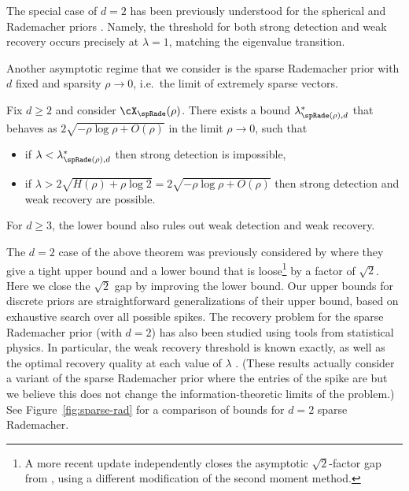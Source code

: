 \documentclass{article}
\begin{document}
The special case of $d=2$ has been previously understood for the spherical and Rademacher priors \cite{dam,mrz,pwbm}. Namely, the threshold for both strong detection and weak recovery occurs precisely at $\lambda = 1$, matching the eigenvalue transition.

Another asymptotic regime that we consider is the sparse Rademacher prior with $d$ fixed and sparsity $\rho \to 0$, i.e.\ the limit of extremely sparse vectors.

\begin{theorem}\label{thm:p0-sparse-rademacher}
Fix $d \ge 2$ and consider $\cX_\spRade(\rho)$. There exists a bound $\lambda^*_{\spRade(\rho),d}$ that behaves as $2\sqrt{-\rho \log \rho + O(\rho)}$ in the limit $\rho \to 0$, such that
\begin{itemize}
    \item if $\lambda < \lambda^*_{\spRade(\rho),d}$ then
    strong detection is impossible,
    \item if $\lambda > 2\sqrt{H(\rho) + \rho \log 2} = 2\sqrt{-\rho \log \rho + O(\rho)}$ then
    strong detection and weak recovery are possible.
\end{itemize}
For $d \ge 3$, the lower bound also rules out weak detection and weak recovery.
\end{theorem}

\noindent The $d = 2$ case of the above theorem was previously considered by \cite{bmvx} where they give a tight upper bound and a lower bound that is loose\footnote{A more recent update \cite{bmvvx} independently closes the asymptotic $\sqrt{2}$-factor gap from \cite{bmvx}, using a different modification of the second moment method.} by a factor of $\sqrt{2}$. Here we close the $\sqrt{2}$ gap by improving the lower bound. Our upper bounds for discrete priors are straightforward generalizations of their upper bound, based on exhaustive search over all possible spikes. The recovery problem for the sparse Rademacher prior (with $d=2$) has also been studied using tools from statistical physics. In particular, the weak recovery threshold is known exactly, as well as the optimal recovery quality at each value of $\lambda$ \cite{mmse-lowrank,mi,mi-proof,lelarge-limits-lowrank}. (These results actually consider a variant of the sparse Rademacher prior where the entries of the spike are \iid but we believe this does not change the information-theoretic limits of the problem.) See Figure~\ref{fig:sparse-rad} for a comparison of bounds for $d=2$ sparse Rademacher.
\end{document}

